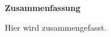 
\cleardoublepage
{}
\thispagestyle{section}

\noindent \textbf{\textsf{\large Zusammenfassung}}\newline

\vspace{1.2em}
\noindent Hier wird zusammengefasst.